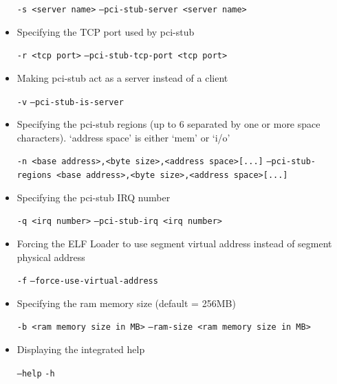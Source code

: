 \begin{itemize}
\texttt{-s <server name>}
\texttt{--pci-stub-server <server name>}

\item Specifying the TCP port used by pci-stub

\texttt{-r <tcp port>}
\texttt{--pci-stub-tcp-port <tcp port>}

\item Making pci-stub act as a server instead of a client

\texttt{-v}
\texttt{--pci-stub-is-server}

\item Specifying the pci-stub regions (up to 6 separated by one or more space characters). ‘address space’ is either ‘mem’ or ‘i/o’

\texttt{-n <base address>,<byte size>,<address space>[...]}
\texttt{--pci-stub-regions <base address>,<byte size>,<address space>[...]}

\item Specifying the pci-stub IRQ number

\texttt{-q <irq number>}
\texttt{--pci-stub-irq <irq number>}

\item Forcing the ELF Loader to use segment virtual address instead of segment physical address

\texttt{-f}
\texttt{--force-use-virtual-address}

\item Specifying the ram memory size (default = 256MB)

\texttt{-b <ram memory size in MB>}
\texttt{--ram-size <ram memory size in MB>}

\item Displaying the integrated help

\texttt{--help}
\texttt{-h}

\end{itemize}